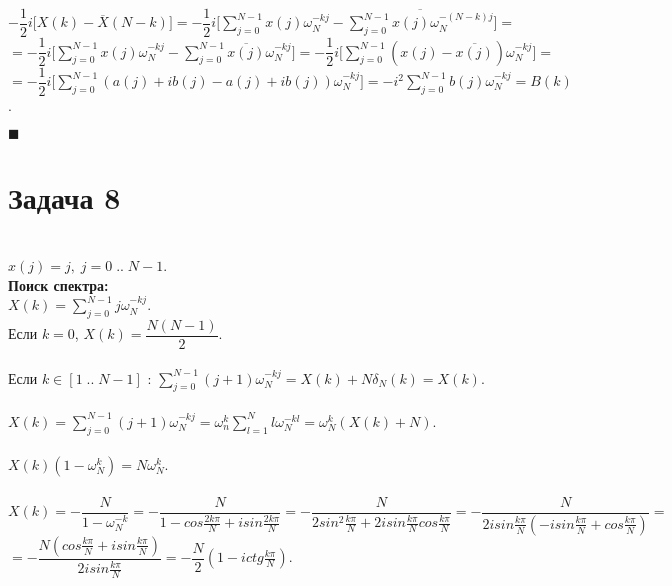 \documentclass{article}
\newcommand\proofend{\begin{flushright}$\blacksquare$\end{flushright}}
\begin{document}
{	$-\dfrac{1}{2} i\big [ X(k) - \overline{X}(N - k) \big ] = -\dfrac{1}{2}i \big [ \sum\limits_{j = 0}^{N - 1} x(j) \omega_N^{-kj} - \overline{\sum\limits_{j = 0}^{N - 1} x(j) \omega_N^{-(N - k)j}}\big ] = $\\
	$= -\dfrac{1}{2} i\big [ \sum\limits_{j = 0}^{N - 1} x(j) \omega_N^{-kj} - \sum\limits_{j = 0}^{N - 1} \overline{x(j)} \omega_N^{-kj}\big ] = -\dfrac{1}{2}i \big [ \sum\limits_{j = 0}^{N - 1} (x(j) - \overline{x(j)}) \omega_N^{-kj}\big ] = $ \\
	$= -\dfrac{1}{2}i \big [ \sum\limits_{j = 0}^{N - 1} (a(j) + ib(j) - a(j) + ib(j)) \omega_N^{-kj}\big ] = -i^2\sum\limits_{j = 0}^{N - 1} b(j) \omega_N^{-kj} = B(k)$.



	\proofend





\pagebreak
\section*{Задача 8} ~\\
	$x(j) = j, \;j = 0\;..\;N-1$.\\
	\textbf{Поиск спектра:}\\

	$X(k) = \sum\limits_{j = 0}^{N - 1} j \omega_N^{-kj}$.\\
	Если $k = 0$, $X(k) = \dfrac{N(N-1)}{2}$.\\ \\

	Если $k \in [1\;..\;N-1]$ : $\sum\limits_{j = 0}^{N - 1} (j + 1) \omega_N^{-kj} = X(k) + N\delta_N(k) = X(k)$.\\ \\
	$X(k) = \sum\limits_{j = 0}^{N - 1} (j + 1) \omega_N^{-kj} = \omega_n^k\sum\limits_{l = 1}^N l\omega_N^{-kl} = \omega_N^k(X(k) + N)$.\\ \\
	$X(k) (1 - \omega_N^k) = N \omega_N^k$. \\ \\
	$X(k) = -\dfrac{N}{1 - \omega_N^{-k}} = -\dfrac{N}{1 - cos\frac{2k\pi}{N} + i sin\frac{2k\pi}{N}} = -\dfrac{N}{2sin^2\frac{k\pi}{N} + 2isin\frac{k\pi}{N}cos\frac{k\pi}{N}} = -\dfrac{N}{2isin\frac{k\pi}{N}(-isin\frac{k\pi}{N} + cos\frac{k\pi}{N})} = $\\
	$ = -\dfrac{N(cos\frac{k\pi}{N} + isin\frac{k\pi}{N})}{2isin\frac{k\pi}{N}} = -\dfrac{N}{2}(1 - ictg\frac{k\pi}{N})$. \\ \\ \\


}
\end{document}
